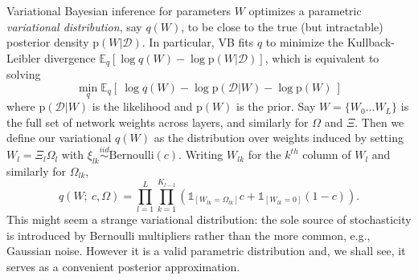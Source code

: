 \documentclass[12pt]{article}
\newcommand{\mc}[1]{\mathcal{#1}}
\newcommand{\mr}[1]{\mathrm{#1}}
\newcommand{\ds}[1]{\mathds{#1}}
\begin{document}
 Variational Bayesian inference \citep[VB; e.g.,][]{bishop_pattern_2006} for parameters $W$ optimizes a parametric {\it variational distribution}, say $q(W)$, to be close to the true (but intractable) posterior  density $\mr{p}(W | \mc{D})$.  In particular, VB fits $q$ to minimize the Kullback-Leibler divergence $\ds{E}_q\left[\log q(W) - \log \mr{p}(W | \mc{D})\right]$, which is equivalent to solving
\begin{equation}\label{kldiv}
 \min_q \ds{E}_q \left[~\log q(W) - \log \mr{p}(\mc{D}|W) -  \log \mr{p}(W)~\right]
 \end{equation}  
where $\mr{p}(\mc{D}|W)$ is the likelihood and $\mr{p}(W)$ is the prior.  
 Say $W = \{W_0 \ldots W_L\}$ is the full set of network weights across layers, and similarly for $\Omega$ and $\Xi$. Then we define our variational $q(W)$ as the distribution over weights induced by setting $W_l = \Xi_l\Omega_l$ with $\xi_{lk} \stackrel{iid}{\sim} \mr{Bernoulli}(c)$.  Writing $W_{lk}$ for the $k^{th}$ column of $W_l$ and similarly for $\Omega_{lk}$, 
 \begin{equation}\label{vardist}
 q(W; ~c, \Omega)  =   
 \prod_{l = 1}^L \prod_{k = 1}^{K_{l-1}} \left(\ds{1}_{[W_{lk}=\Omega_{lk}]}c + \ds{1}_{[W_{lk}=0]}(1-c)\right).
 \end{equation}
 This might seem a strange variational distribution: the sole source of stochasticity is introduced by Bernoulli multipliers rather than the more common, e.g., Gaussian noise.  However it is a valid parametric distribution and, we shall see, it serves as a convenient posterior approximation.
\end{document}
